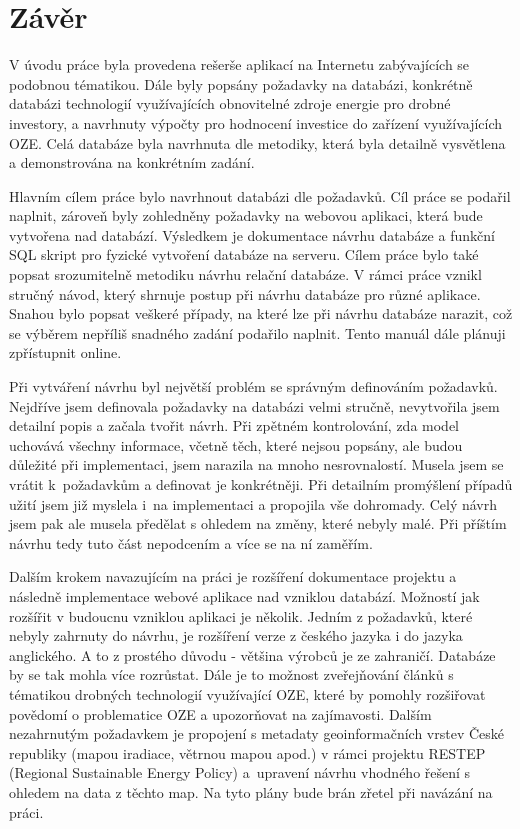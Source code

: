 \documentclass[11pt,a4paper]{article}
\begin{document}
\newpage
\section{Závěr}
V úvodu práce byla provedena rešerše aplikací na Internetu zabývajících se podobnou tématikou. Dále byly popsány požadavky na databázi, konkrétně databázi technologií využívajících obnovitelné zdroje energie pro drobné investory, a navrhnuty výpočty pro hodnocení investice do zařízení využívajících OZE. Celá databáze byla navrhnuta dle metodiky, která byla detailně vysvětlena a demonstrována na konkrétním zadání. 

Hlavním cílem práce bylo navrhnout databázi dle požadavků. Cíl práce se podařil naplnit, zároveň byly zohledněny požadavky na webovou aplikaci, která bude vytvořena nad databází. Výsledkem je dokumentace návrhu databáze a funkční SQL skript pro fyzické vytvoření databáze na serveru. Cílem práce bylo také popsat srozumitelně metodiku návrhu relační databáze. V rámci práce vznikl stručný návod, který shrnuje postup při návrhu databáze pro různé aplikace. Snahou bylo popsat veškeré případy, na které lze při návrhu databáze narazit, což se výběrem nepříliš snadného zadání podařilo naplnit. Tento manuál dále plánuji zpřístupnit online.  

Při vytváření návrhu byl největší problém se správným definováním požadavků. Nejdříve jsem definovala požadavky na databázi velmi stručně, nevytvořila jsem detailní popis a začala tvořit návrh. Při zpětném kontrolování, zda model uchovává všechny informace, včetně těch, které nejsou popsány, ale budou důležité při implementaci, jsem narazila na mnoho nesrovnalostí. Musela jsem se vrátit k~požadavkům a definovat je konkrétněji. Při detailním promýšlení případů užití jsem již myslela i~na implementaci a propojila vše dohromady. Celý návrh jsem pak ale musela předělat s ohledem na změny, které nebyly malé. Při příštím návrhu tedy tuto část nepodcením a více se na ní zaměřím.

Dalším krokem navazujícím na práci je rozšíření dokumentace projektu a následně implementace webové aplikace nad vzniklou databází. Možností jak rozšířit v budoucnu vzniklou aplikaci je několik. Jedním z požadavků, které nebyly zahrnuty do návrhu, je rozšíření verze z českého jazyka i do jazyka anglického. A to z prostého důvodu - většina výrobců je ze zahraničí. Databáze by se tak mohla více rozrůstat. Dále je to možnost zveřejňování článků s tématikou drobných technologií využívající OZE, které by pomohly rozšiřovat povědomí o problematice OZE a upozorňovat na zajímavosti. Dalším nezahrnutým požadavkem je propojení s metadaty geoinformačních vrstev České republiky (mapou iradiace, větrnou mapou apod.) v rámci projektu RESTEP (Regional Sustainable Energy Policy) a~upravení návrhu vhodného řešení s ohledem na data z těchto map. Na tyto plány bude brán zřetel při navázání na práci.
\end{document}
